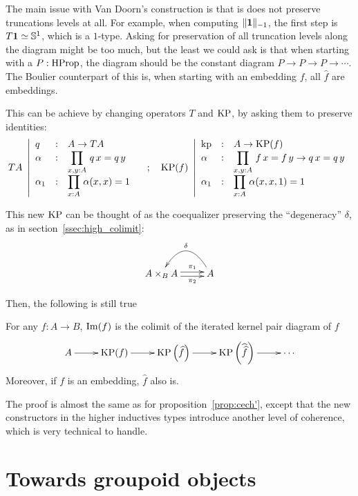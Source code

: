 The main issue with Van Doorn's construction is
that is does not preserve truncations levels at all. For example, when
computing $\|\mathbf{1}\|_{-1}$, the first step is $T\mathbf{1} \simeq \mathbb{S}^1$,
which is a $1$-type. 
Asking for preservation of all truncation levels along the diagram
might be too much, but the least we could ask is that when starting
with a $P:\operatorname{HProp}$, the diagram should be the constant diagram $P\to
P \to P\to \cdots$. The Boulier counterpart of this is, when starting
with an embedding $f$, all $\widehat f$ are embeddings. 

This can be achieve by changing operators $T$ and $\operatorname{KP}$, by asking
them to preserve identities:
\[
  TA~\left|
    \begin{array}{lll}
      q&:& A\to TA \\
      \alpha&:& \displaystyle{\prod_{x,y:A}\, q\, x = q\, y} \\
      \alpha_1&:& \displaystyle{\prod_{x:A}\, \alpha(x,x) = 1}
    \end{array}
  \right.
  \quad ; \quad
  \operatorname{KP}(f)~\left|
    \begin{array}{lll}
      \operatorname{kp}&:&A\to \operatorname{KP}(f) \\
      \alpha&:& \displaystyle{\prod_{x,y:A}\, f\, x = f\, y \to q\, x = q\, y} \\
      \alpha_1&:& \displaystyle{\prod_{x:A}\, \alpha(x,x,1) = 1}
    \end{array}    
  \right.
\]

This new $\operatorname{KP}$ can be thought of as the coequalizer preserving the
``degeneracy'' $\delta$, as in section~\ref{ssec:high_colimit}:
\[ 
  \xymatrix{
    A\times_B A \ar@<-.5ex>[r]_-{\pi_2}
    \ar@<.5ex>[r]^-{\pi_1} & A \ar@/_2pc/[l]_\delta
  }
\]

Then, the following is still true

\begin{prop}\label{prop:cech}
  For any $f:A\to B$, $\operatorname{Im}(f)$ is the colimit of the iterated kernel
  pair diagram of $f$
\[\xymatrix{
  A \ar[r] & \KP(f) \ar[r] & \KP\left(\widehat f\right) \ar[r]& \KP\left(\widehat{\widehat f}\right) \ar[r]& \cdots
}\]
Moreover, if $f$ is an embedding, $\widehat f$ also is.
\end{prop}
The proof is almost the same as for proposition~\ref{prop:cech'},
except that the new constructors in the higher inductives types
introduce another level of coherence, which is very technical to handle.

\section{Towards groupoid objects}
\label{sec:groupoid}

